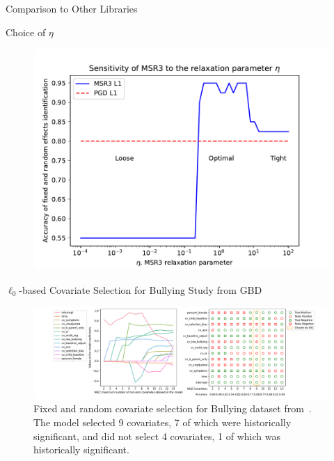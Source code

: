 \documentclass[8pt]{beamer}
\begin{document}
\begin{frame}{Comparison to Other Libraries}
\begin{table}
	
\end{table}
\end{frame}

\begin{frame}{Choice of $\eta$}
	\begin{figure}
		\includegraphics[width=\textwidth]{Figures/eta_L1.pdf}
	\end{figure}
\end{frame}

\begin{frame}{$\ell_0$-based Covariate Selection for Bullying Study from GBD}
	\begin{figure}
		\includegraphics[width=\textwidth]{Figures/bullying_data_assessment_selection.pdf}
		\caption{Fixed and random covariate selection for Bullying dataset from~\cite{GBD}. The model selected 9 covariates, 7 of which were historically significant, and did not select 4 covariates, 1 of which was historically significant.}
	\end{figure}
\end{frame}
\end{document}
